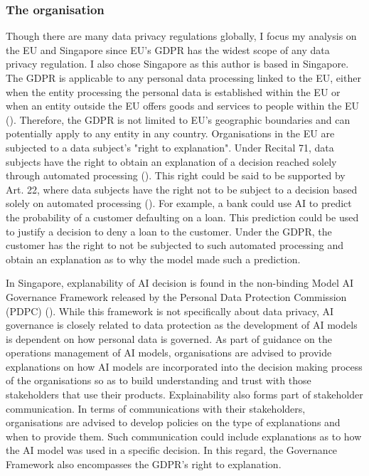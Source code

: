\subsubsection{The organisation}
Though there are many data privacy regulations globally, I focus my analysis on the EU and Singapore since EU's GDPR has the widest scope of any data privacy regulation. I also chose Singapore as this author is based in Singapore. The GDPR is applicable to any personal data processing linked to the EU, either when the entity processing the personal data is established within the EU or when an entity outside the EU offers goods and services to people within the EU (\cite{gdpr_art3}). Therefore, the GDPR is not limited to EU's geographic boundaries and can potentially apply to any entity in any country. Organisations in the EU are subjected to a data subject's "right to explanation". Under Recital 71, data subjects have the right to obtain an explanation of a decision reached solely through automated processing (\cite{gdpr_recital71}). This right could be said to be supported by Art. 22, where data subjects have the right not to be subject to a decision based solely on automated processing (\cite{gdpr_art22}). For example, a bank could use AI to predict the probability of a customer defaulting on a loan. This prediction could be used to justify a decision to deny a loan to the customer. Under the GDPR, the customer has the right to not be subjected to such automated processing and obtain an explanation as to why the model made such a prediction.

In Singapore, explanability of AI decision is found in the non-binding Model AI Governance Framework released by the Personal Data Protection Commission (PDPC) (\cite{ai_modelframework}). While this framework is not specifically about data privacy, AI governance is closely related to data protection as the development of AI models is dependent on how personal data is governed. As part of guidance on the operations management of AI models, organisations are advised to provide explanations on how AI models are incorporated into the decision making process of the organisations so as to build understanding and trust with those stakeholders that use their products. Explainability also forms part of stakeholder communication. In terms of communications with their stakeholders, organisations are advised to develop policies on the type of explanations and when to provide them. Such communication could include explanations as to how the AI model was used in a specific decision. In this regard, the Governance Framework also encompasses the GDPR's right to explanation.

